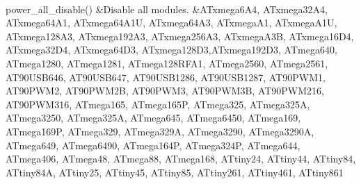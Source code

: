 \begin{center}
\begin{longtabu}
\\
power\+\_\+all\+\_\+disable() &Disable all modules. &A\+Txmega6\+A4, A\+Txmega32\+A4, A\+Txmega64\+A1, A\+Txmega64\+A1U, A\+Txmega64\+A3, A\+Txmega\+A1, A\+Txmega\+A1U, A\+Txmega128\+A3, A\+Txmega192\+A3, A\+Txmega256\+A3, A\+Txmega\+A3B, A\+Txmega16\+D4, A\+Txmega32\+D4, A\+Txmega64\+D3, A\+Txmega128\+D3,A\+Txmega192\+D3, A\+Tmega640, A\+Tmega1280, A\+Tmega1281, A\+Tmega128\+R\+F\+A1, A\+Tmega2560, A\+Tmega2561, A\+T90\+U\+S\+B646, A\+T90\+U\+S\+B647, A\+T90\+U\+S\+B1286, A\+T90\+U\+S\+B1287, A\+T90\+P\+W\+M1, A\+T90\+P\+W\+M2, A\+T90\+P\+W\+M2B, A\+T90\+P\+W\+M3, A\+T90\+P\+W\+M3B, A\+T90\+P\+W\+M216, A\+T90\+P\+W\+M316, A\+Tmega165, A\+Tmega165P, A\+Tmega325, A\+Tmega325A, A\+Tmega3250, A\+Tmega325A, A\+Tmega645, A\+Tmega6450, A\+Tmega169, A\+Tmega169P, A\+Tmega329, A\+Tmega329A, A\+Tmega3290, A\+Tmega3290A, A\+Tmega649, A\+Tmega6490, A\+Tmega164P, A\+Tmega324P, A\+Tmega644, A\+Tmega406, A\+Tmega48, A\+Tmega88, A\+Tmega168, A\+Ttiny24, A\+Ttiny44, A\+Ttiny84, A\+Ttiny84A, A\+Ttiny25, A\+Ttiny45, A\+Ttiny85, A\+Ttiny261, A\+Ttiny461, A\+Ttiny861  \\
\end{longtabu}
\end{center}  
\normalsize  